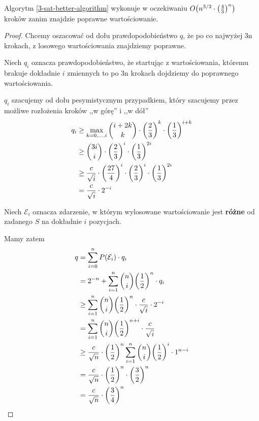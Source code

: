 \begin{theorem}
	Algorytm \ref{3-sat-better-algorithm} wykonuje w oczekiwaniu \( O\pars{n^{3/2} \cdot \pars{\frac{4}{3}}^n} \) kroków zanim znajdzie poprawne wartościowanie.
\end{theorem}
\begin{proof}
	Chcemy oszacować od dołu prawdopodobieństwo \( q \), że po co najwyżej 3n krokach, z losowego wartościowania znajdziemy poprawne.

	Niech \( q_i \) oznacza prawdopodobieństwo, że startując z wartościowania, któremu brakuje dokładnie \( i \) zmiennych to po 3n krokach dojdziemy do poprawnego wartościowania.

	\( q_i\) szacujemy od dołu pesymistycznym przypadkiem, który szacujemy przez możliwe rozłożenia kroków ,,w górę'' i ,,w dół''
	\begin{align*}
		q_i
		 & \geq \max_{k = 0, \dots, i} \binom{i + 2k}{k} \cdot \left(\frac{2}{3}\right)^k\cdot\left(\frac{1}{3}\right)^{i + k}   \\
		 & \geq \binom{3i}{i} \cdot \left(\frac{2}{3}\right)^i\cdot\left(\frac{1}{3}\right)^{2i}                                 \\
		 & \geq \frac{c}{\sqrt{i}}\cdot \left(\frac{27}{4}\right)^i \cdot \left(\frac{2}{3}\right)^i\cdot\left(\frac{1}{3}\right)^{2i} \\
		 & = \frac{c}{\sqrt{i}}\cdot2^{-i}
	\end{align*}

	Niech \( \mathcal{E}_i \) oznacza zdarzenie, w którym wylosowane wartościowanie jest \textbf{różne} od zadanego \( S \) na dokładnie \( i \) pozycjach.


	Mamy zatem
	\begin{align*}
		q
		 & = \sum_{i=0}^n P(\mathcal{E}_i) \cdot q_i                                                                      \\
		 & = 2^{-n} + \sum_{i=1}^n \binom{n}{i}\pars{\frac{1}{2}}^n \cdot q_i                                             \\
		 & \geq \sum_{i=1}^n \binom{n}{i}\pars{\frac{1}{2}}^n \cdot \frac{c}{\sqrt{i}}\cdot2^{-i}                         \\
		 & = \sum_{i=1}^n \binom{n}{i}\pars{\frac{1}{2}}^{n+i} \cdot \frac{c}{\sqrt{i}}                                   \\
		 & \geq \frac{c}{\sqrt{n}} \cdot \pars{\frac{1}{2}}^n \sum_{i=1}^n \binom{n}{i}\pars{\frac{1}{2}}^i \cdot 1^{n-i} \\
		 & = \frac{c}{\sqrt{n}} \cdot \pars{\frac{1}{2}}^n \cdot \pars{\frac{3}{2}}^n                                     \\
		 & = \frac{c}{\sqrt{n}} \cdot \pars{\frac{3}{4}}^n                                                                \\
	\end{align*}


\end{proof}
